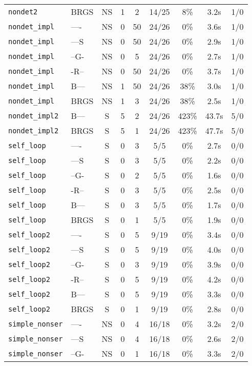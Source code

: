 \begin{tabular}{llccccccc}
\texttt{nondet2} & BRGS & NS & 1 & 2 & 14/25 & 8\% & 3.2s & 1/0 \\
\texttt{nondet_impl} & ---- & NS & 0 & 50 & 24/26 & 0\% & 3.6s & 1/0 \\
\texttt{nondet_impl} & ---S & NS & 0 & 50 & 24/26 & 0\% & 2.9s & 1/0 \\
\texttt{nondet_impl} & --G- & NS & 0 & 5 & 24/26 & 0\% & 2.7s & 1/0 \\
\texttt{nondet_impl} & -R-- & NS & 0 & 50 & 24/26 & 0\% & 3.7s & 1/0 \\
\texttt{nondet_impl} & B--- & NS & 1 & 50 & 24/26 & 38\% & 3.0s & 1/0 \\
\texttt{nondet_impl} & BRGS & NS & 1 & 3 & 24/26 & 38\% & 2.5s & 1/0 \\
\texttt{nondet_impl2} & B--- & S & 5 & 2 & 24/26 & 423\% & 43.7s & 5/0 \\
\texttt{nondet_impl2} & BRGS & S & 5 & 1 & 24/26 & 423\% & 47.7s & 5/0 \\
\texttt{self_loop} & ---- & S & 0 & 3 & 5/5 & 0\% & 2.7s & 0/0 \\
\texttt{self_loop} & ---S & S & 0 & 3 & 5/5 & 0\% & 2.2s & 0/0 \\
\texttt{self_loop} & --G- & S & 0 & 2 & 5/5 & 0\% & 1.6s & 0/0 \\
\texttt{self_loop} & -R-- & S & 0 & 3 & 5/5 & 0\% & 2.5s & 0/0 \\
\texttt{self_loop} & B--- & S & 0 & 3 & 5/5 & 0\% & 1.7s & 0/0 \\
\texttt{self_loop} & BRGS & S & 0 & 1 & 5/5 & 0\% & 1.9s & 0/0 \\
\texttt{self_loop2} & ---- & S & 0 & 5 & 9/19 & 0\% & 3.4s & 0/0 \\
\texttt{self_loop2} & ---S & S & 0 & 5 & 9/19 & 0\% & 4.0s & 0/0 \\
\texttt{self_loop2} & --G- & S & 0 & 3 & 9/19 & 0\% & 3.9s & 0/0 \\
\texttt{self_loop2} & -R-- & S & 0 & 5 & 9/19 & 0\% & 4.2s & 0/0 \\
\texttt{self_loop2} & B--- & S & 0 & 5 & 9/19 & 0\% & 3.3s & 0/0 \\
\texttt{self_loop2} & BRGS & S & 0 & 1 & 9/19 & 0\% & 2.8s & 0/0 \\
\texttt{simple_nonser} & ---- & NS & 0 & 4 & 16/18 & 0\% & 3.2s & 2/0 \\
\texttt{simple_nonser} & ---S & NS & 0 & 4 & 16/18 & 0\% & 2.6s & 2/0 \\
\texttt{simple_nonser} & --G- & NS & 0 & 1 & 16/18 & 0\% & 3.3s & 2/0 \\

\end{tabular}
